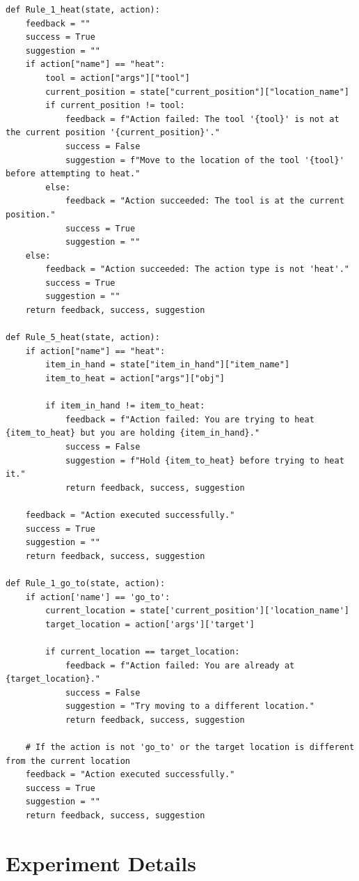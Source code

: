 \documentclass{article} %
\begin{document}
\begin{lstlisting}
def Rule_1_heat(state, action):
    feedback = ""
    success = True
    suggestion = ""
    if action["name"] == "heat":
        tool = action["args"]["tool"]
        current_position = state["current_position"]["location_name"]
        if current_position != tool:
            feedback = f"Action failed: The tool '{tool}' is not at the current position '{current_position}'."
            success = False
            suggestion = f"Move to the location of the tool '{tool}' before attempting to heat."
        else:
            feedback = "Action succeeded: The tool is at the current position."
            success = True
            suggestion = ""
    else:
        feedback = "Action succeeded: The action type is not 'heat'."
        success = True
        suggestion = ""
    return feedback, success, suggestion
    
def Rule_5_heat(state, action):
    if action["name"] == "heat":
        item_in_hand = state["item_in_hand"]["item_name"]
        item_to_heat = action["args"]["obj"]
        
        if item_in_hand != item_to_heat:
            feedback = f"Action failed: You are trying to heat {item_to_heat} but you are holding {item_in_hand}."
            success = False
            suggestion = f"Hold {item_to_heat} before trying to heat it."
            return feedback, success, suggestion
        
    feedback = "Action executed successfully."
    success = True
    suggestion = ""
    return feedback, success, suggestion

def Rule_1_go_to(state, action):
    if action['name'] == 'go_to':
        current_location = state['current_position']['location_name']
        target_location = action['args']['target']
        
        if current_location == target_location:
            feedback = f"Action failed: You are already at {target_location}."
            success = False
            suggestion = "Try moving to a different location."
            return feedback, success, suggestion
        
    # If the action is not 'go_to' or the target location is different from the current location
    feedback = "Action executed successfully."
    success = True
    suggestion = ""
    return feedback, success, suggestion
\end{lstlisting}



\section{Experiment Details}
\end{document}
